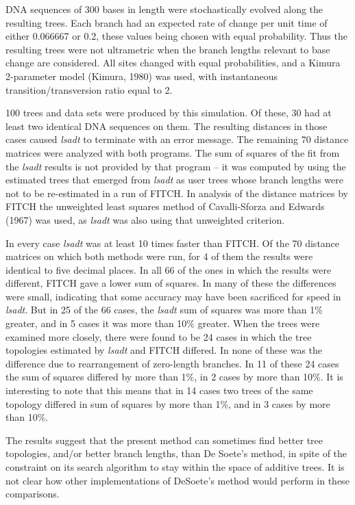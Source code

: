 \documentclass[12pt]{article}
\begin{document}
DNA sequences of 300 bases in length were stochastically evolved along
the resulting trees.  Each branch had an expected rate of change per unit
time of either 0.066667 or 0.2, these values being chosen with equal
probability.  Thus the resulting trees were not ultrametric when the branch
lengths relevant to base change are considered.  All sites changed with
equal probabilities, and a Kimura 2-parameter model (Kimura, 1980) was used,
with instantaneous transition/transversion ratio equal to 2.

100 trees and data sets were produced by this simulation.  Of these,
30 had at least two identical DNA sequences on them.  The resulting
distances in those cases caused {\it lsadt} to terminate with an error
message.  The remaining 70 distance matrices were analyzed with both
programs.  The sum of squares of the fit from the {\it lsadt} results is
not provided by that program -- it was computed by using the estimated
trees that emerged from {\it lsadt} as user trees whose branch lengths
were not to be re-estimated in a run of FITCH.  In analysis of the distance
matrices by FITCH the unweighted least squares method of Cavalli-Sforza and
Edwards (1967) was used, as {\it lsadt} was also using that unweighted
criterion.

In every case {\it lsadt} was at least 10 times faster than FITCH.
Of the 70 distance matrices on which both methods were run, for 4 of them
the results were identical to five decimal places.  In all 66 of the
ones in which the results were different, FITCH gave a lower sum of squares.
In many of these the differences were small, indicating that some accuracy
may have been sacrificed for speed in {\it lsadt}.  But in 25 of the 66 cases, the {\it lsadt}
sum of squares was more than 1\% greater, and in 5 cases it was more than
10\% greater.
When the trees were examined more closely,
there were found to be 24 cases in which the tree topologies estimated by
{\it lsadt} and FITCH differed.  In none of these was the difference due to
rearrangement of zero-length branches.  In 11 of these 24
cases the sum of squares differed by more than 1\%, in 2 cases by more than
10\%.  It is interesting to note that this means that in 14 cases two
trees of the same topology differed in sum of squares by more than 1\%,
and in 3 cases by more than 10\%.

The results suggest that the present method can sometimes find better
tree topologies, and/or better branch lengths, than De Soete's method,
in spite of the constraint on its search algorithm to stay within the space of
additive trees.  It is not clear how other implementations of DeSoete's
method would perform in these comparisons.
\bigskip
\end{document}
